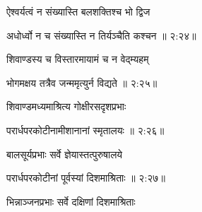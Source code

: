 {\devanagarifont ऐश्वर्यत्वं न संख्यास्ति बलशक्तिश्च भो द्विज \thinspace{\dandab} \dontdisplaylinenum }%


{\devanagarifont अधोर्ध्वो न च संख्यास्ति न तिर्यञ्चैति कश्चन {॥ २:२४॥} \veg\dontdisplaylinenum }%

{\devanagarifont शिवाण्डस्य च विस्तारमायामं च न वेद्म्यहम् \thinspace{\dandab} \dontdisplaylinenum }%
 

{\devanagarifont भोगमक्षय तत्रैव जन्ममृत्युर्न विद्यते {॥ २:२५॥} \veg\dontdisplaylinenum }%

{\devanagarifont शिवाण्डमध्यमाश्रित्य गोक्षीरसदृशप्रभाः \thinspace{\dandab} \dontdisplaylinenum }%


{\devanagarifont परार्धपरकोटीनामीशानानां स्मृतालयः {॥ २:२६॥} \veg\dontdisplaylinenum }%

{\devanagarifont बालसूर्यप्रभाः सर्वे ज्ञेयास्तत्पुरुषालये \thinspace{\dandab} \dontdisplaylinenum }%


{\devanagarifont परार्धपरकोटीनां पूर्वस्यां दिशमाश्रिताः {॥ २:२७॥} \veg\dontdisplaylinenum }%

{\devanagarifont भिन्नाञ्जनप्रभाः सर्वे दक्षिणां दिशमाश्रिताः \thinspace{\dandab} \dontdisplaylinenum }%

